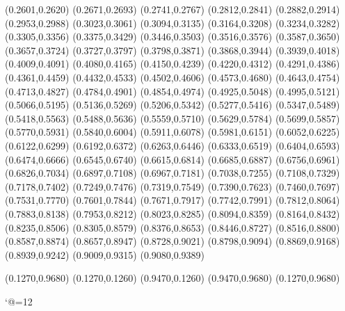 (0.2601,0.2620)
(0.2671,0.2693)
(0.2741,0.2767)
(0.2812,0.2841)
(0.2882,0.2914)
(0.2953,0.2988)
(0.3023,0.3061)
(0.3094,0.3135)
(0.3164,0.3208)
(0.3234,0.3282)
(0.3305,0.3356)
(0.3375,0.3429)
(0.3446,0.3503)
(0.3516,0.3576)
(0.3587,0.3650)
(0.3657,0.3724)
(0.3727,0.3797)
(0.3798,0.3871)
(0.3868,0.3944)
(0.3939,0.4018)
(0.4009,0.4091)
(0.4080,0.4165)
(0.4150,0.4239)
(0.4220,0.4312)
(0.4291,0.4386)
(0.4361,0.4459)
(0.4432,0.4533)
(0.4502,0.4606)
(0.4573,0.4680)
(0.4643,0.4754)
(0.4713,0.4827)
(0.4784,0.4901)
(0.4854,0.4974)
(0.4925,0.5048)
(0.4995,0.5121)
(0.5066,0.5195)
(0.5136,0.5269)
(0.5206,0.5342)
(0.5277,0.5416)
(0.5347,0.5489)
(0.5418,0.5563)
(0.5488,0.5636)
(0.5559,0.5710)
(0.5629,0.5784)
(0.5699,0.5857)
(0.5770,0.5931)
(0.5840,0.6004)
(0.5911,0.6078)
(0.5981,0.6151)
(0.6052,0.6225)
(0.6122,0.6299)
(0.6192,0.6372)
(0.6263,0.6446)
(0.6333,0.6519)
(0.6404,0.6593)
(0.6474,0.6666)
(0.6545,0.6740)
(0.6615,0.6814)
(0.6685,0.6887)
(0.6756,0.6961)
(0.6826,0.7034)
(0.6897,0.7108)
(0.6967,0.7181)
(0.7038,0.7255)
(0.7108,0.7329)
(0.7178,0.7402)
(0.7249,0.7476)
(0.7319,0.7549)
(0.7390,0.7623)
(0.7460,0.7697)
(0.7531,0.7770)
(0.7601,0.7844)
(0.7671,0.7917)
(0.7742,0.7991)
(0.7812,0.8064)
(0.7883,0.8138)
(0.7953,0.8212)
(0.8023,0.8285)
(0.8094,0.8359)
(0.8164,0.8432)
(0.8235,0.8506)
(0.8305,0.8579)
(0.8376,0.8653)
(0.8446,0.8727)
(0.8516,0.8800)
(0.8587,0.8874)
(0.8657,0.8947)
(0.8728,0.9021)
(0.8798,0.9094)
(0.8869,0.9168)
(0.8939,0.9242)
(0.9009,0.9315)
(0.9080,0.9389)

\PST@Border(0.1270,0.9680)
(0.1270,0.1260)
(0.9470,0.1260)
(0.9470,0.9680)
(0.1270,0.9680)

\catcode`@=12
\fi
\endpspicture
